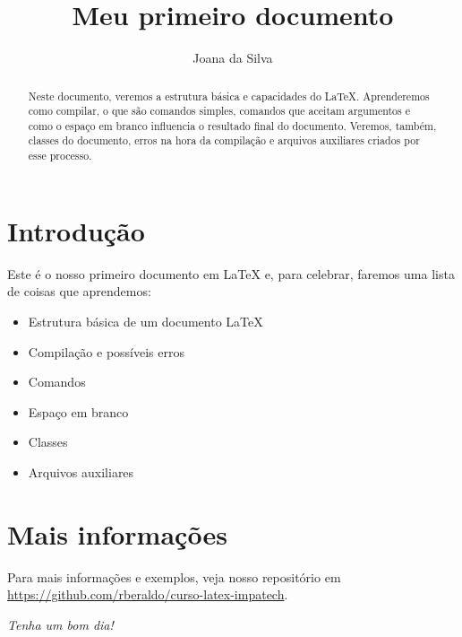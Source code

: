 \documentclass[11pt,a4paper,oneside]{article}
\title{Meu primeiro documento}
\author{Joana da Silva}
\begin{document}
\frenchspacing

\maketitle

\begin{abstract}
  Neste documento, veremos a estrutura básica e capacidades do \LaTeX. Aprenderemos como compilar, o que são comandos simples, comandos que aceitam argumentos e como o espaço em branco influencia o resultado final do documento. Veremos, também, classes do documento, erros na hora da compilação e arquivos auxiliares criados por esse processo.
\end{abstract}

\tableofcontents

\section{Introdução}

Este é o nosso primeiro documento em \LaTeX{} e, para celebrar, faremos uma lista de coisas que aprendemos:

\begin{itemize}
  \item Estrutura básica de um documento \LaTeX
  \item Compilação e possíveis erros
  \item Comandos
  \item Espaço em branco
  \item Classes
  \item Arquivos auxiliares
\end{itemize}

\section{Mais informações}

Para mais informações e exemplos, veja nosso repositório em
\url{https://github.com/rberaldo/curso-latex-impatech}.

\begin{center}
  \textit{Tenha um bom dia!}
\end{center}
\end{document}
